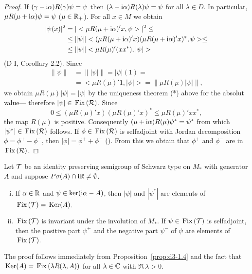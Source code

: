 \begin{proof}
If $(\gamma - \mathrm{i}\alpha)R(\gamma)\psi = \psi$ then $(\lambda - \mathrm{i}\alpha)R(\lambda)\psi = \psi$ for all $\lambda \in D$.
In particular, $\mu R(\mu + \mathrm{i}\alpha)\psi = \psi$ ($\mu \in \mathbb{R}_+$).
For all $x \in M$ we obtain
\begin{align*}
|\psi(x)|^2 &= |<\mu R(\mu+\im\alpha)'x,\psi>|^2 \leq \\
&\leq \|\psi\| <(\mu R(\mu+\im\alpha)'x)(\mu R(\mu+\im\alpha)'x)^{*},\psi> \leq \\
&\leq \|\psi\| <\mu R(\mu)'(xx^{*}),|\psi|>
\end{align*}
(D-I, Corollary 2.2).
Since
\begin{align*}
\|\psi\| &= \| |\psi| \| = |\psi|(1) = \\
&= <\mu R(\mu)'1,|\psi|> = \| \mu R(\mu)|\psi| \|,
\end{align*}
we obtain $\mu R(\mu)|\psi| = |\psi|$ by the uniqueness theorem (*) above for the absolut value---
therefore $|\psi| \in \mathop{}\mathrm{Fix}\left(\mathcal{R}\right) $.
Since
\[
0 \leq (\mu R(\mu)'x)(\mu R(\mu)'x)^{*} \leq \mu R(\mu)'xx^{*},
\]
the map $R(\mu)$ is positive.
Consequently $(\mu+\mathrm{i}\alpha)R(\mu)\psi^{*} = \psi^{*}$ from which $|\psi^{*}| \in \mathop{}\mathrm{Fix}\left(\mathcal{R}\right) $ follows.
If $\phi \in \mathop{}\mathrm{Fix}\left(\mathcal{R}\right) $ is selfadjoint with Jordan decomposition $\phi = \phi^{+} - \phi^{-}$, then $|\phi| = \phi^{+} + \phi^{-}$ (\citet[Theorem III.4.2.]{takesaki:1979}).
From this we obtain that $\phi^{+}$ and $\phi^{-}$ are in $ \mathop{}\mathrm{Fix}\left(\mathcal{R}\right) $.
\end{proof}
\begin{corollary}\label{cor:d3-1.5}
Let $\mathcal{T}$ be an identity preserving semigroup of Schwarz type on $M_{*}$ with generator $A$ and suppose $P\sigma(A) \cap \mathrm{i}\mathbb{R} \neq \emptyset$.
\begin{enumerate}[(i)]
\item
If $\alpha \in \mathbb{R}$ and $\psi \in \operatorname{ker}(\mathrm{i}\alpha - A)$, then $|\psi|$ and $|\psi^{*}|$ are elements of $\mathop{}\mathrm{Fix}\left(\mathcal{T}\right) = \mathop{}\mathrm{Ker}(A)$.

\item 
$\mathop{}\mathrm{Fix}\left(\mathcal{T}\right)$ is invariant under the involution of $M_{*}$.
If $\psi \in \mathop{}\mathrm{Fix}\left(\mathcal{T}\right)$ is selfadjoint, then the positive part $\psi^{+}$ and the negative part $\psi^{-}$ of $\psi$ are elements of $\mathop{}\mathrm{Fix}\left(\mathcal{T}\right)$.
\end{enumerate}

\end{corollary}
The proof follows immediately from Proposition~\ref{prop:d3-1.4} and the fact that $\mathop{}\mathrm{Ker}(A) = \mathop{}\mathrm{Fix}\left(\lambda R(\lambda,A)\right)$ for all $\lambda \in \mathbb{C}$ with $\Re\,\lambda > 0$.

